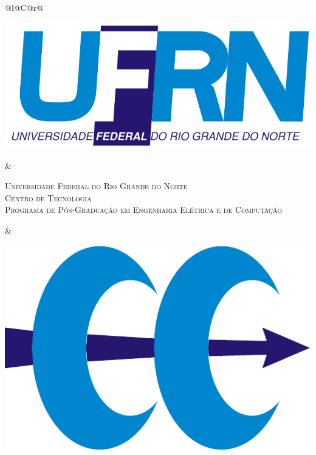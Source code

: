 %
%

\begin{titlepage}

\begin{center}

\small

\begin{tabularx}{\linewidth}{@{}l@{}C@{}r@{}}
\parbox[c]{3cm}{\includegraphics[width=\linewidth]{pre-textuais/figuras/UFRN}} &
\begin{center}
\textsf{\textsc{Universidade Federal do Rio Grande do Norte\\
Centro de Tecnologia\\
Programa de Pós-Graduação em Engenharia Elétrica e de Computação}}
\end{center} &
\parbox[c]{2cm}{\includegraphics[width=\linewidth]{pre-textuais/figuras/PPgEE}}
\end{tabularx}


\end{center}
\end{titlepage}
